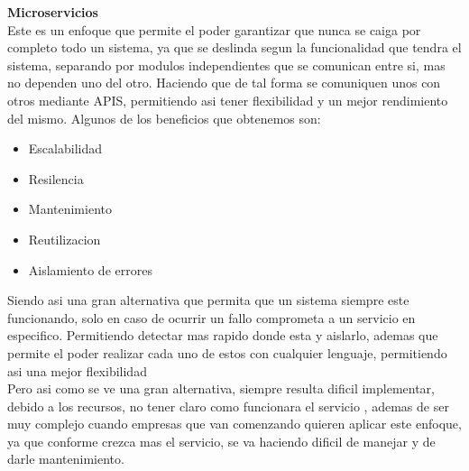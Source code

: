 \documentclass[12pt]{article}
\begin{document}
\textbf{Microservicios } \\
Este es un enfoque que permite el poder garantizar que nunca se caiga por completo todo un sistema, ya que se deslinda segun la funcionalidad que tendra el sistema, separando por modulos independientes que se comunican entre si, mas no dependen uno del otro. Haciendo que de tal forma se comuniquen unos con otros mediante APIS, permitiendo asi tener flexibilidad y un mejor rendimiento del mismo.
Algunos de los beneficios que obtenemos son:
\begin{itemize}
    \item Escalabilidad
    \item Resilencia
    \item Mantenimiento
    \item Reutilizacion
    \item Aislamiento de errores
\end{itemize}
Siendo asi  una gran alternativa que permita que un sistema siempre este funcionando, solo en caso de ocurrir un fallo  comprometa a un servicio en especifico. Permitiendo detectar mas rapido donde esta y aislarlo,  ademas que permite el poder realizar cada uno de estos con cualquier lenguaje, permitiendo asi una mejor flexibilidad
 \\ 
Pero asi como se ve una gran alternativa, siempre resulta dificil implementar, debido a los recursos, no tener claro como funcionara el servicio , ademas de ser muy complejo cuando empresas que van comenzando quieren aplicar este enfoque, ya que conforme crezca mas el servicio, se va haciendo dificil de manejar y de darle mantenimiento.
 \\
\end{document}
